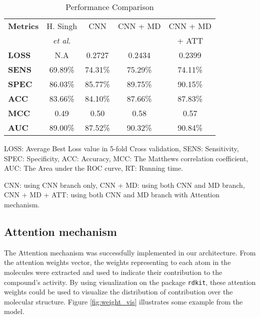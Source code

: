 \documentclass[conference]{IEEEtran}
\begin{document}
\begin{table}[htbp]    
    \centering    
    \begin{threeparttable}
        \caption{Performance Comparison }
        \label{tab:perform}
        \centering    
        \begin{tabular}{lcccc}
        \hline
        \textbf{Metrics} \tnote{\textdagger}
                        & H. Singh  & CNN   & CNN + MD & CNN + MD \\
                        &\textit{et al.}    &   &   & + ATT \tnote{\textdaggerdbl}  \\
        \hline
        \textbf{LOSS}   & N.A                      & 0.2727  & 0.2434   & 0.2399   \\
        \textbf{SENS}   & 69.89\%                  & 74.31\% & 75.29\%  & 74.11\%   \\
        \textbf{SPEC}   & 86.03\%                  & 85.77\% & 89.75\%  & 90.15\%   \\
        \textbf{ACC}    & 83.66\%                  & 84.10\% & 87.66\%  & 87.83\%   \\
\textbf{MCC}    & 0.49                  & 0.50  & 0.58  & 0.57  \\
        \textbf{AUC}    & 89.00\%                  & 87.52\%  & 90.32\%  & 90.84\%  \\
\hline      
        \end{tabular}
        \begin{tablenotes}
            \footnotesize
            \item[\textdagger] LOSS: Average Best Loss value in 5-fold Cross validation, SENS: Sensitivity, SPEC: Specificity, ACC: Accuracy, MCC: The Matthews correlation coefficient, AUC: The Area under the ROC curve, RT: Running time.
            \item[\textdaggerdbl] CNN: using CNN branch only, CNN + MD: using both CNN and MD branch, CNN + MD + ATT: using both CNN and MD branch with Attention mechanism.
        \end{tablenotes}
    \end{threeparttable}
\end{table}





\subsection{Attention mechanism}\label{subsec:res_att}
The Attention mechanism was successfully implemented in our architecture. From the attention weights vector, the weights representing to each atom in the molecules were extracted and used to indicate their contribution to the compound's activity. By using visualization on the package \texttt{rdkit}, these attention weights could be used to visualize the distribution of contribution over the molecular structure. Figure \ref{fig:weight_vis} illustrates some example from the model.
\end{document}
